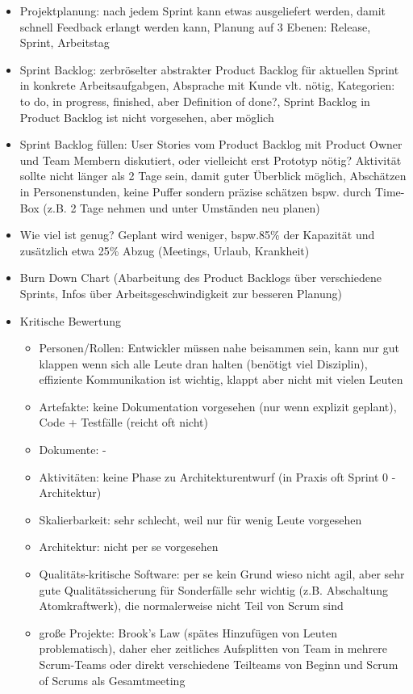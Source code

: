 \documentclass[paper=a4, fontsize=11pt]{scrartcl} %
\numberwithin{equation}{section} %
\numberwithin{figure}{section} %
\numberwithin{table}{section} %
\begin{document}
\begin{itemize}
\begin{itemize}
    \item Projektplanung: nach jedem Sprint kann etwas ausgeliefert werden, damit schnell Feedback erlangt werden kann, Planung auf 3 Ebenen: Release, Sprint, Arbeitstag
    \item Sprint Backlog: zerbröselter abstrakter Product Backlog für aktuellen Sprint in konkrete Arbeitsaufgabgen, Absprache mit Kunde vlt. nötig, Kategorien: to do, in progress, finished, aber Definition of done?, Sprint Backlog in Product Backlog ist nicht vorgesehen, aber möglich
    \item Sprint Backlog füllen: User Stories vom Product Backlog mit Product Owner und Team Membern diskutiert, oder vielleicht erst Prototyp nötig? Aktivität sollte nicht länger als 2 Tage sein, damit guter Überblick möglich, Abschätzen in Personenstunden, keine Puffer sondern präzise schätzen bspw. durch Time-Box (z.B. 2 Tage nehmen und unter Umständen neu planen)
    \item Wie viel ist genug? Geplant wird weniger, bspw.85\% der Kapazität und zusätzlich etwa 25\% Abzug (Meetings, Urlaub, Krankheit)
    \item Burn Down Chart (Abarbeitung des Product Backlogs über verschiedene Sprints, Infos über Arbeitsgeschwindigkeit zur besseren Planung)
    \item Kritische Bewertung
    \begin{itemize}
      \item Personen/Rollen: Entwickler müssen nahe beisammen sein, kann nur gut klappen wenn sich alle Leute dran halten (benötigt viel Disziplin), effiziente Kommunikation ist wichtig, klappt aber nicht mit vielen Leuten
      \item Artefakte: keine Dokumentation vorgesehen (nur wenn explizit geplant), Code + Testfälle (reicht oft nicht)
      \item Dokumente: -
      \item Aktivitäten: keine Phase zu Architekturentwurf (in Praxis oft Sprint 0 - Architektur)
      \item Skalierbarkeit: sehr schlecht, weil nur für wenig Leute vorgesehen
      \item Architektur: nicht per se vorgesehen
      \item Qualitäts-kritische Software: per se kein Grund wieso nicht agil, aber sehr gute Qualitätssicherung für Sonderfälle sehr wichtig (z.B. Abschaltung Atomkraftwerk), die normalerweise nicht Teil von Scrum sind
      \item große Projekte: Brook's Law (spätes Hinzufügen von Leuten problematisch), daher eher zeitliches Aufsplitten von Team in mehrere Scrum-Teams oder direkt verschiedene Teilteams von Beginn und Scrum of Scrums als Gesamtmeeting

\end{itemize}
\end{itemize}
\end{itemize}
\end{document}
